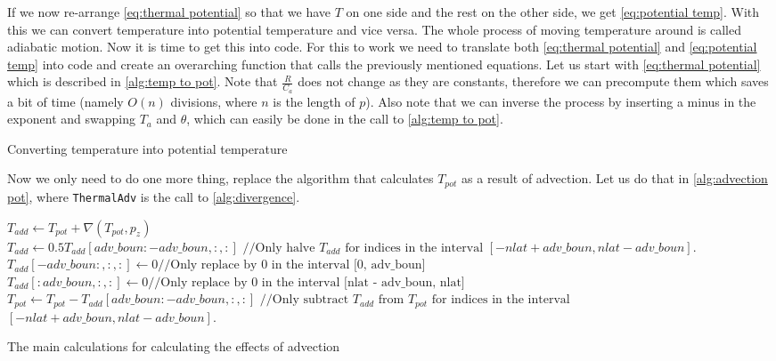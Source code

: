 If we now re-arrange \autoref{eq:thermal potential} so that we have $T$ on one side and the rest on the other side, we get \autoref{eq:potential temp}. With this we can convert temperature into 
potential temperature and vice versa. The whole process of moving temperature around is called adiabatic motion. Now it is time to get this into code. For this to work we need to translate both 
\autoref{eq:thermal potential} and \autoref{eq:potential temp} into code and create an overarching function that calls the previously mentioned equations. Let us start with 
\autoref{eq:thermal potential} which is described in \autoref{alg:temp to pot}. Note that $\frac{R}{C_a}$ does not change as they are constants, therefore we can precompute them which saves 
a bit of time (namely $O(n)$ divisions, where $n$ is the length of $p$). Also note that we can inverse the process by inserting a minus in the exponent and swapping $T_a$ 
and $\theta$, which can easily be done in the call to \autoref{alg:temp to pot}.

\begin{algorithm}
    \Return{$\theta$}
    \caption{Converting temperature into potential temperature}
    \label{alg:temp to pot}
\end{algorithm}

Now we only need to do one more thing, replace the algorithm that calculates $T_{pot}$ as a result of advection. Let us do that in \autoref{alg:advection pot}, where \texttt{ThermalAdv} is the 
call to \autoref{alg:divergence}.

\begin{algorithm}
    $T_{add} \leftarrow T_{pot} + \nabla(T_{pot}, p_z)$\;
    $T_{add} \leftarrow 0.5T_{add}[adv\_boun:-adv\_boun, :, :] \text{ //Only halve } T_{add} \text{ for indices in the interval } [-nlat + adv\_boun, nlat - adv\_boun]$. \;
    $T_{add}[-adv\_boun:, :, :] \leftarrow 0 \text{//Only replace by 0 in the interval [0, adv\_boun]}$ \;
    $T_{add}[:adv\_boun, :, :] \leftarrow 0 \text{//Only replace by 0 in the interval [nlat - adv\_boun, nlat]}$ \;
    $T_{pot} \leftarrow T_{pot} - T_{add}[adv\_boun:-adv\_boun, :, :] \text{ //Only subtract } T_{add} \text{ from } T_{pot} \text{ for indices in the interval }$
        $[-nlat + adv\_boun, nlat - adv\_boun]$. \;
    \caption{The main calculations for calculating the effects of advection}
    \label{alg:advection pot}
\end{algorithm}